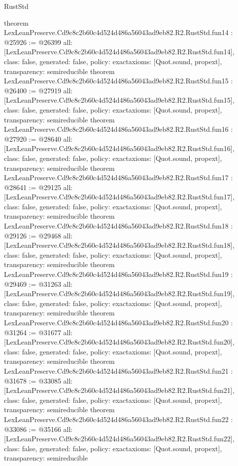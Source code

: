\begin{lexlean}{RustStd}
\begin{coremodule}
{}
theorem LexLeanPreserve.Cd9c8c2b60c4d524d486a56043ad9eb82.R2.RustStd.fun14 : @25926 := @26399 {
  all: [LexLeanPreserve.Cd9c8c2b60c4d524d486a56043ad9eb82.R2.RustStd.fun14],
  class: false,
  generated: false,
  policy: exact{axioms: [Quot.sound, propext]},
  transparency: semireducible
}
theorem LexLeanPreserve.Cd9c8c2b60c4d524d486a56043ad9eb82.R2.RustStd.fun15 : @26400 := @27919 {
  all: [LexLeanPreserve.Cd9c8c2b60c4d524d486a56043ad9eb82.R2.RustStd.fun15],
  class: false,
  generated: false,
  policy: exact{axioms: [Quot.sound, propext]},
  transparency: semireducible
}
theorem LexLeanPreserve.Cd9c8c2b60c4d524d486a56043ad9eb82.R2.RustStd.fun16 : @27920 := @28640 {
  all: [LexLeanPreserve.Cd9c8c2b60c4d524d486a56043ad9eb82.R2.RustStd.fun16],
  class: false,
  generated: false,
  policy: exact{axioms: [Quot.sound, propext]},
  transparency: semireducible
}
theorem LexLeanPreserve.Cd9c8c2b60c4d524d486a56043ad9eb82.R2.RustStd.fun17 : @28641 := @29125 {
  all: [LexLeanPreserve.Cd9c8c2b60c4d524d486a56043ad9eb82.R2.RustStd.fun17],
  class: false,
  generated: false,
  policy: exact{axioms: [Quot.sound, propext]},
  transparency: semireducible
}
theorem LexLeanPreserve.Cd9c8c2b60c4d524d486a56043ad9eb82.R2.RustStd.fun18 : @29126 := @29468 {
  all: [LexLeanPreserve.Cd9c8c2b60c4d524d486a56043ad9eb82.R2.RustStd.fun18],
  class: false,
  generated: false,
  policy: exact{axioms: [Quot.sound, propext]},
  transparency: semireducible
}
theorem LexLeanPreserve.Cd9c8c2b60c4d524d486a56043ad9eb82.R2.RustStd.fun19 : @29469 := @31263 {
  all: [LexLeanPreserve.Cd9c8c2b60c4d524d486a56043ad9eb82.R2.RustStd.fun19],
  class: false,
  generated: false,
  policy: exact{axioms: [Quot.sound, propext]},
  transparency: semireducible
}
theorem LexLeanPreserve.Cd9c8c2b60c4d524d486a56043ad9eb82.R2.RustStd.fun20 : @31264 := @31677 {
  all: [LexLeanPreserve.Cd9c8c2b60c4d524d486a56043ad9eb82.R2.RustStd.fun20],
  class: false,
  generated: false,
  policy: exact{axioms: [Quot.sound, propext]},
  transparency: semireducible
}
theorem LexLeanPreserve.Cd9c8c2b60c4d524d486a56043ad9eb82.R2.RustStd.fun21 : @31678 := @33085 {
  all: [LexLeanPreserve.Cd9c8c2b60c4d524d486a56043ad9eb82.R2.RustStd.fun21],
  class: false,
  generated: false,
  policy: exact{axioms: [Quot.sound, propext]},
  transparency: semireducible
}
theorem LexLeanPreserve.Cd9c8c2b60c4d524d486a56043ad9eb82.R2.RustStd.fun22 : @33086 := @35166 {
  all: [LexLeanPreserve.Cd9c8c2b60c4d524d486a56043ad9eb82.R2.RustStd.fun22],
  class: false,
  generated: false,
  policy: exact{axioms: [Quot.sound, propext]},
  transparency: semireducible
}
\end{coremodule}
\end{lexlean}
